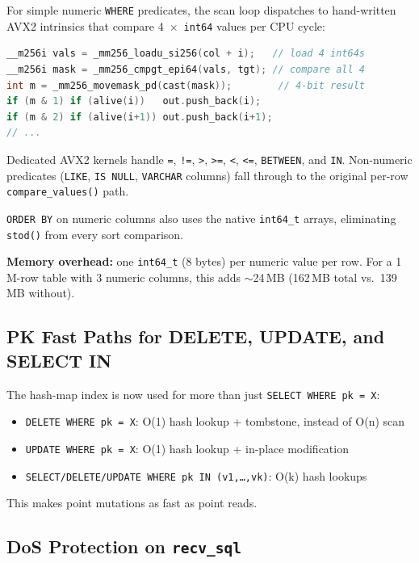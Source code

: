 \documentclass[12pt,a4paper]{article}
\begin{document}
For simple numeric \texttt{WHERE} predicates, the scan loop dispatches to hand-written
AVX2 intrinsics that compare 4~$\times$~\texttt{int64} values per CPU cycle:

\begin{lstlisting}[language=C++,basicstyle=\ttfamily\small,title={AVX2 scan kernel (simplified)}]
__m256i vals = _mm256_loadu_si256(col + i);   // load 4 int64s
__m256i mask = _mm256_cmpgt_epi64(vals, tgt); // compare all 4
int m = _mm256_movemask_pd(cast(mask));        // 4-bit result
if (m & 1) if (alive(i))   out.push_back(i);
if (m & 2) if (alive(i+1)) out.push_back(i+1);
// ...
\end{lstlisting}

Dedicated AVX2 kernels handle \texttt{=}, \texttt{!=}, \texttt{>}, \texttt{>=},
\texttt{<}, \texttt{<=}, \texttt{BETWEEN}, and \texttt{IN}. Non-numeric predicates
(\texttt{LIKE}, \texttt{IS NULL}, \texttt{VARCHAR} columns) fall through to the original
per-row \texttt{compare\_values()} path.

\texttt{ORDER BY} on numeric columns also uses the native \texttt{int64\_t} arrays,
eliminating \texttt{stod()} from every sort comparison.

\textbf{Memory overhead:} one \texttt{int64\_t} (8 bytes) per numeric value per row.
For a 1\,M-row table with 3 numeric columns, this adds $\sim$24\,MB (162\,MB total
vs.\ 139\,MB without).

\subsection{PK Fast Paths for DELETE, UPDATE, and SELECT IN}

The hash-map index is now used for more than just \texttt{SELECT WHERE pk = X}:

\begin{itemize}[noitemsep]
  \item \texttt{DELETE WHERE pk = X}: O(1) hash lookup + tombstone, instead of O(n) scan
  \item \texttt{UPDATE WHERE pk = X}: O(1) hash lookup + in-place modification
  \item \texttt{SELECT/DELETE/UPDATE WHERE pk IN (v1,\ldots,vk)}: O(k) hash lookups
\end{itemize}

This makes point mutations as fast as point reads.

\subsection{DoS Protection on \texttt{recv\_sql}}
\end{document}
